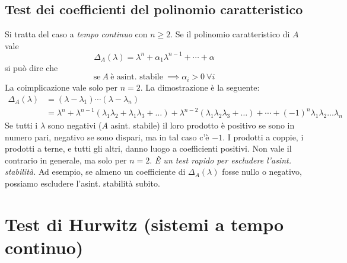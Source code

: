 \subsection{Test dei coefficienti del polinomio caratteristico}

Si tratta del caso a \textit{tempo continuo} con $n\geq 2$. Se il polinomio caratteristico di $A$ vale
\begin{equation*}
	\Delta _A\left(\lambda \right) =\lambda ^n +\alpha _1 \lambda ^{n-1} +\cdots +\alpha 
\end{equation*}
si può dire che
\begin{equation*}
	\boxed{\text{se} \ A\ \text{è asint. stabile} \ \implies \alpha _i  >0\ \forall i}
\end{equation*}
La coimplicazione vale solo per $n=2$. La dimostrazione è la seguente:
\begin{equation*}
	\begin{aligned}
		\Delta _A\left(\lambda \right) & =\left(\lambda -\lambda _1\right) \cdots \left(\lambda -\lambda _n\right)                                                                                                                                                              \\
		                               & =\lambda ^n +\lambda ^{n-1}\left(\lambda _1 \lambda _2 +\lambda _1 \lambda _3 +\dotsc \right) +\lambda ^{n-2}\left(\lambda _1 \lambda _2 \lambda _3 +\dotsc \right) +\cdots +\left(-1\right)^n \lambda _1 \lambda _2 \dotsc \lambda _n 
	\end{aligned}
\end{equation*}
Se tutti i $\lambda $ sono negativi ($A$ asint. stabile) il loro prodotto è positivo se sono in numero pari, negativo se sono dispari, ma in tal caso c'è $-1$. I prodotti a coppie, i prodotti a terne, e tutti gli altri, danno luogo a coefficienti positivi. Non vale il contrario in generale, ma solo per $n=2$. \textit{È un test rapido per escludere l'asint. stabilità.} Ad esempio, se almeno un coefficiente di $\Delta _A\left(\lambda \right)$ fosse nullo o negativo, possiamo escludere l'asint. stabilità subito.

\section{Test di Hurwitz (sistemi a tempo continuo)}

